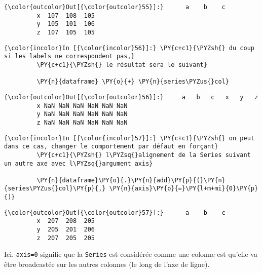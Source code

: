 \begin{Verbatim}[commandchars=\\\{\},frame=single,framerule=0.3mm,rulecolor=\color{cellframecolor}]
{\color{outcolor}Out[{\color{outcolor}55}]:}      a    b    c
         x  107  108  105
         y  105  101  106
         z  107  105  105
\end{Verbatim}
            
    \begin{Verbatim}[commandchars=\\\{\},frame=single,framerule=0.3mm,rulecolor=\color{cellframecolor}]
{\color{incolor}In [{\color{incolor}56}]:} \PY{c+c1}{\PYZsh{} du coup si les labels ne correspondent pas,}
         \PY{c+c1}{\PYZsh{} le résultat sera le suivant}
         
         \PY{n}{dataframe} \PY{o}{+} \PY{n}{series\PYZus{}col}
\end{Verbatim}


\begin{Verbatim}[commandchars=\\\{\},frame=single,framerule=0.3mm,rulecolor=\color{cellframecolor}]
{\color{outcolor}Out[{\color{outcolor}56}]:}     a   b   c   x   y   z
         x NaN NaN NaN NaN NaN NaN
         y NaN NaN NaN NaN NaN NaN
         z NaN NaN NaN NaN NaN NaN
\end{Verbatim}
            
    \begin{Verbatim}[commandchars=\\\{\},frame=single,framerule=0.3mm,rulecolor=\color{cellframecolor}]
{\color{incolor}In [{\color{incolor}57}]:} \PY{c+c1}{\PYZsh{} on peut dans ce cas, changer le comportement par défaut en forçant}
         \PY{c+c1}{\PYZsh{} l\PYZsq{}alignement de la Series suivant un autre axe avec l\PYZsq{}argument axis}
         
         \PY{n}{dataframe}\PY{o}{.}\PY{n}{add}\PY{p}{(}\PY{n}{series\PYZus{}col}\PY{p}{,} \PY{n}{axis}\PY{o}{=}\PY{l+m+mi}{0}\PY{p}{)}
\end{Verbatim}


\begin{Verbatim}[commandchars=\\\{\},frame=single,framerule=0.3mm,rulecolor=\color{cellframecolor}]
{\color{outcolor}Out[{\color{outcolor}57}]:}      a    b    c
         x  207  208  205
         y  205  201  206
         z  207  205  205
\end{Verbatim}
            
    Ici, \texttt{axis=0} signifie que la \texttt{Series} est considérée
comme une colonne est qu'elle va être broadcastée sur les autres
colonnes (le long de l'axe de ligne).

